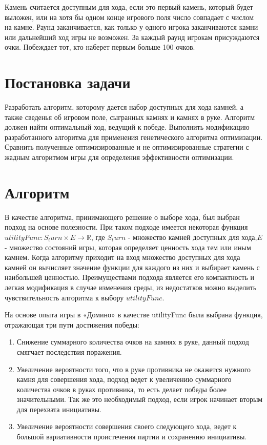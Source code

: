 \documentclass[11pt]{article}
\begin{document}
Камень считается доступным для хода, если это первый камень, который будет выложен, или на хотя бы одном конце игрового поля число совпадает с числом на камне. Раунд заканчивается, как только у одного игрока заканчиваются камни или дальнейший ход игры не возможен. За каждый раунд игрокам присуждаются очки. Побеждает тот, кто наберет первым больше 100 очков.

\section{Постановка задачи}
Разработать алгоритм, которому дается набор доступных для хода камней, а также сведенья об игровом поле, сыгранных камнях и камнях в руке. Алгоритм должен найти оптимальный ход, ведущий к победе. Выполнить модификацию разработанного алгоритма для применения генетического алгоритма оптимизации. Сравнить полученные оптимизированные и не оптимизированные стратегии с жадным алгоритмом игры для определения эффективности оптимизации. 


\section{Алгоритм}
В качестве алгоритма, принимающего решение о выборе хода, был выбран подход на основе полезности. При таком подходе имеется некоторая функция $utilityFunc:S_ turn \times E \rightarrow \mathbb{R}$, где $S_ turn$ - множество камней доступных для хода,$E$ - множество состояний игры, которая определяет ценность хода тем или иным камнем. Когда алгоритму приходит на вход множество доступных для хода камней он вычисляет значение функции для каждого из них и выбирает камень с наибольшей ценностью. Преимуществами подхода является его компактность и легкая модификация в случае изменения среды, из недостатков можно выделить чувствительность алгоритма к выбору $utilityFunc$.


На основе опыта игры в «Домино» в качестве utilityFunc была выбрана функция, отражающая три пути достижения победы: 
\begin{enumerate}
    \item Снижение суммарного количества очков на камнях в руке, данный подход смягчает последствия поражения. 
    \item Увеличение вероятности того, что в руке противника не окажется нужного камня для совершения хода, подход ведет к увеличению суммарного количества очков в руках противника, то есть делает победы более значительными. Так же это необходимый подход, если игрок начинает вторым для перехвата инициативы. 
    \item Увеличение вероятности совершения своего следующего хода, ведет к большой вариативности проистечения партии и сохранению инициативы.
\end{enumerate}
\end{document}
